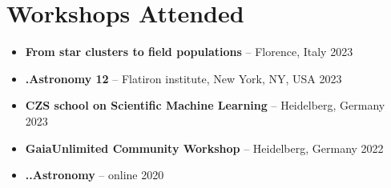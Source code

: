 \section*{Workshops Attended}

\begin{itemize}
    \item \textbf{From star clusters to field populations} -- Florence, Italy \hfill 2023
    \item \textbf{.Astronomy 12} -- Flatiron institute, New York, NY, USA \hfill 2023
    \item \textbf{CZS school on Scientific Machine Learning} -- Heidelberg, Germany \hfill 2023
    \item \textbf{GaiaUnlimited Community Workshop} -- Heidelberg, Germany \hfill 2022
    \item \textbf{..Astronomy} -- online \hfill 2020
\end{itemize}